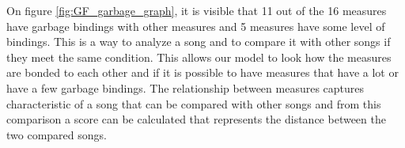 On figure \ref{fig:GF_garbage_graph}, it is visible that 11 out of the 16 measures have garbage bindings with other measures and 5 measures have some level of bindings. This is a way to analyze a song and to compare it with other songs if they meet the same condition. This allows our model to look how the measures are bonded to each other and if it is possible to have measures that have a lot or have a few garbage bindings. The relationship between measures captures characteristic of a song that can be compared with other songs and from this comparison a score can be calculated that represents the distance between the two compared songs.


